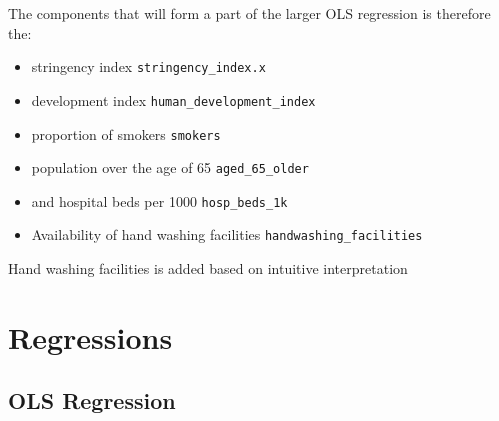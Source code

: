 \documentclass[11pt,preprint, authoryear]{elsarticle}
\numberwithin{equation}{section}
\numberwithin{figure}{section}
\numberwithin{table}{section}
\def\tightlist{} %
\begin{document}
The components that will form a part of the larger OLS regression is
therefore the:

\begin{itemize}
\tightlist
\item
  stringency index \texttt{stringency\_index.x}
\end{itemize}

\begin{itemize}
\item
  development index \texttt{human\_development\_index}
\item
  proportion of smokers \texttt{smokers}
\item
  population over the age of 65 \texttt{aged\_65\_older}
\item
  and hospital beds per 1000 \texttt{hosp\_beds\_1k}
\item
  Availability of hand washing facilities
  \texttt{handwashing\_facilities}
\end{itemize}

Hand washing facilities is added based on intuitive interpretation

\hypertarget{regressions}{%
\section{Regressions}\label{regressions}}

\hypertarget{ols-regression}{%
\subsection{OLS Regression}\label{ols-regression}}
\end{document}
